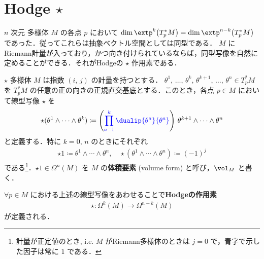\documentclass[geometry_main]{subfiles}
\begin{document}
\section{Hodge $\star$}

$n$ 次元 \cinfty 多様体 $M$ の各点 $p$ において $\dim \extp^k \bigl(T^*_pM\bigr) = \dim \extp^{n-k}\bigl(T^*_pM\bigr)$ であった．従ってこれらは抽象ベクトル空間としては同型である．
$M$ にRiemann計量が入っており，かつ向き付けられているならば，同型写像を自然に定めることができる．それがHodgeの $\star$ 作用素である．

\begin{mydef}[label=hodge]{ $\star$ } 
	\cinfty 多様体 $M$ は指数 $(i,\, j)$ の計量を持つとする．
	$\theta^1,\, \dots ,\, \theta^k,\, \theta^{k+1} ,\, \dots ,\, \theta^{n} \in T_p^*M$ を $T_p^*M$ の任意の正の向きの正規直交基底とする．このとき，各点 $ p \in M$ において線型写像 $\star$ を
	\begin{align} 
		\star(\theta^1 \wedge \cdots \wedge \theta^k) \coloneqq \left(\textcolor{blue}{\prod_{a=1}^k \dualip{\theta^a}{\theta^a}} \right)\, \theta^{k+1} \wedge \dots \wedge \theta^{n}
	\end{align}
	と定義する．特に $k = 0,\, n$ のときにそれぞれ
	\begin{align} 
		\star 1 \coloneqq \theta^1 \wedge \cdots \wedge \theta^n,\quad \star (\theta^1 \wedge \cdots \wedge \theta^n) \coloneqq (-1)^j
	\end{align}
	である\footnote{計量が正定値のとき, i.e. $M$ がRiemann多様体のときは $j=0$ で，青字で示した因子は常に $1$ である．}．$\star 1 \in \Omega^n(M)$ を $M$ の\textbf{体積要素} (volume form) と呼び，$\vol_M$ と書く．
	
	$\forall p \in M$ における上述の線型写像をあわせることで\textbf{Hodgeの作用素}
	\begin{align} 
		\star \colon \Omega^k(M) \to \Omega^{n-k}(M)
	\end{align}
	が定義される．
\end{mydef}
\end{document}

